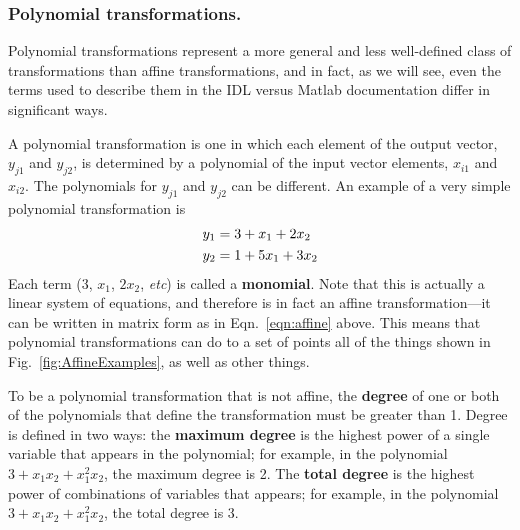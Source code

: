 \documentclass[11pt]{article}
\begin{document}
\subsubsection{Polynomial transformations.}

Polynomial transformations represent a more general and less well-defined class of transformations than affine transformations, and in fact, as we will see, even the terms used to describe them in the IDL versus Matlab documentation differ in significant ways.  

A polynomial transformation is one in which each element of the output vector, $y_{j1}$ and $y_{j2}$, is determined by a polynomial of the input vector elements, $x_{i1}$ and $x_{i2}$.  The polynomials for $y_{j1}$ and $y_{j2}$ can be different. An example of a very simple polynomial transformation is 
\begin{align}
      y_1 &=  3+x_1+2x_2\\\notag
      y_2 &= 1+5x_1+ 3x_2
\end{align}
Each term (3, $x_1$, $2x_2$, {\it etc}) is called a {\bf monomial}.  Note that this is actually a linear system of equations, and therefore is in fact an affine transformation---it can be written in matrix form as in Eqn.~\eqref{eqn:affine} above.  This means that polynomial transformations can do to a set of points all of the things shown in Fig.~\ref{fig:AffineExamples}, as well as other things.

To be a polynomial transformation that is not affine, the {\bf degree} of one or both of the polynomials that define the transformation must be greater than 1. Degree is defined in two ways: the {\bf maximum degree} is the highest power of a single variable that appears in the polynomial; for example, in the polynomial $3+x_1x_2+x_1^2x_2$, the maximum degree is 2.  The {\bf total degree} is the highest power of combinations of variables that appears; for example, in the polynomial $3+x_1x_2+x_1^2x_2$, the total degree is 3.
\end{document}
